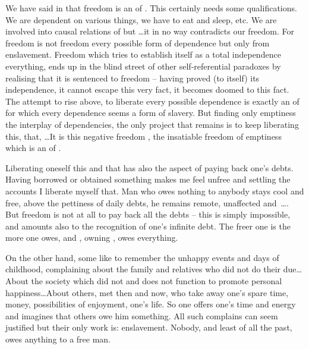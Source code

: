\pa\label{pa:invfreedom} \inv %
We have said in  that freedom is an  of .  This
certainly needs some qualifications.  We are dependent on various things, we
have to eat and sleep, etc. We are involved into causal relations of  but \ldots it in no way contradicts our freedom. For freedom is not
freedom  every possible form of dependence but only from enslavement.
Freedom which tries to establish itself as a total independence 
everything, ends up in the blind street of other self-referential paradoxes by
realising that it is sentenced to freedom -- having proved (to itself) its
independence, it cannot escape  this very fact, it becomes doomed to
this fact.  The attempt to rise
above, to liberate   every possible dependence is exactly
an  of  for which every dependence seems a form of slavery.
But finding only emptiness  the interplay of 
dependencies, the only project that remains is to keep liberating 
this,  that, \ldots It is this negative freedom ,
the insatiable freedom of emptiness which is an  of .

Liberating oneself  this and  that has also the aspect of
paying back one's debts. Having borrowed or obtained something makes me feel
unfree and settling the accounts I liberate myself  that.  Man who
owes nothing to anybody stays cool and free, above the pettiness of daily debts,
he remains remote, unaffected and~\ldots {}.  But freedom is not at all to
pay back all the debts -- this is simply impossible, and 
amounts also to the recognition of one's infinite debt. The freer one is the
more one owes, and , owning , owes everything.

On the other hand, some like to remember the unhappy events and days of
childhood, complaining about the family and relatives who did not do their
due\ldots About the society which did not and does not function to promote personal
happiness\ldots About others, met then and now, who take away one's spare time,
money, possibilities of enjoyment, one's life.  So one offers one's time and
energy and imagines that others owe him something.  All such complains can seem
justified but their only work is: enslavement.  Nobody, and least of all the
past, owes anything to a free man.

